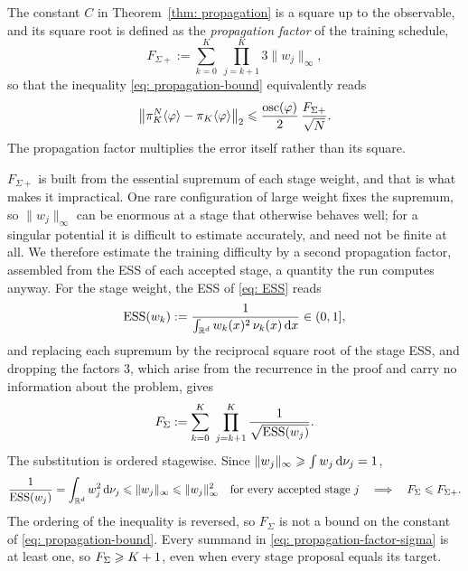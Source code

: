 \documentclass{article}
\begin{document}
The constant $C$ in Theorem~\ref{thm: propagation} is a square up to the observable, and its square root is defined as the \emph{propagation factor} of the training schedule,
\begin{equation}
    F_{\Sigma+}
    := \sum_{k=0}^{K}\ \prod_{j=k+1}^{K} 3\lVert w_j \rVert_\infty ,
    \label{eq: propagation-factor-plus}
\end{equation}
so that the inequality \eqref{eq: propagation-bound} equivalently reads
\begin{equation*}
    \bigl\lVert \pi_K^N\langle \varphi\rangle - \pi_K\langle \varphi\rangle \bigr\rVert_2
    \leqslant \frac{\operatorname{osc}(\varphi)}{2}\, \frac{F_{\Sigma+}}{\sqrt N}.
\end{equation*}
The propagation factor multiplies the error itself rather than its square.

$F_{\Sigma+}$ is built from the essential supremum of each stage weight, and that is what makes it impractical. One rare configuration of large weight fixes the supremum, so $\lVert w_j \rVert_\infty$ can be enormous at a stage that otherwise behaves well; for a singular potential it is difficult to estimate accurately, and need not be finite at all. We therefore estimate the training difficulty by a second propagation factor, assembled from the ESS of each accepted stage, a quantity the run computes anyway. For the stage weight, the ESS of \eqref{eq: ESS} reads
\begin{equation}
    \mathrm{ESS}(w_k) := \frac{1}{\int_{\mathbb R^d} w_k(x)^2 \, \nu_k(x) \, \mathrm{d} x} \in (0,1] ,
    \label{eq: propagation-ESS}
\end{equation}
and replacing each supremum by the reciprocal square root of the stage ESS, and dropping the factors $3$, which arise from the recurrence in the proof and carry no information about the problem, gives
\begin{equation}
    F_{\Sigma}
    := \sum_{k=0}^{K}\ \prod_{j=k+1}^{K} \frac{1}{\sqrt{\mathrm{ESS}(w_j)}} .
    \label{eq: propagation-factor-sigma}
\end{equation}
The substitution is ordered stagewise. Since $\lVert w_j \rVert_\infty \geqslant \int w_j \, \mathrm{d}\nu_j = 1$,
\begin{equation*}
    \frac{1}{\mathrm{ESS}(w_j)} = \int_{\mathbb R^d} w_j^2 \, \mathrm{d}\nu_j \leqslant \lVert w_j \rVert_\infty \leqslant \lVert w_j \rVert_\infty^{2}
    \quad\text{for every accepted stage } j
    \quad\Longrightarrow\quad
    F_\Sigma \leqslant F_{\Sigma+} .
\end{equation*}
The ordering of the inequality is reversed, so $F_\Sigma$ is not a bound on the constant of \eqref{eq: propagation-bound}. Every summand in \eqref{eq: propagation-factor-sigma} is at least one, so $F_\Sigma \geqslant K+1$, even when every stage proposal equals its target.
\end{document}
